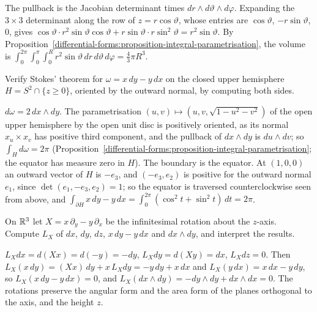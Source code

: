 \begin{solution}
The pullback is the Jacobian determinant times $dr \wedge d\vartheta \wedge d\varphi$. Expanding the $3 \times 3$ determinant along the row of $z = r\cos\vartheta$, whose entries are
$\cos\vartheta$, $-r\sin\vartheta$, $0$, gives $\cos\vartheta \cdot r^2\sin\vartheta\cos\vartheta + r\sin\vartheta \cdot r\sin^2\vartheta = r^2\sin\vartheta$. By
Proposition~\ref{differential-forms:proposition-integral-parametrisation}, the volume is $\int_0^{2\pi}\int_0^\pi\int_0^Rr^2\sin\vartheta\,dr\,d\vartheta\,d\varphi = \frac43\pi R^3$.
\end{solution}

\begin{exercise}\label{differential-forms:exercise-stokes-hemisphere}
Verify Stokes' theorem for $\omega = x\,dy - y\,dx$ on the closed upper hemisphere $H = S^2 \cap \{z \geq 0\}$, oriented by the outward normal, by computing both sides.
\end{exercise}

\begin{solution}
$d\omega = 2\,dx \wedge dy$. The parametrisation $(u, v) \mapsto (u, v, \sqrt{1 - u^2 - v^2})$ of the open upper hemisphere by the open unit disc is positively oriented, as its normal
$x_u \times x_v$ has positive third component, and the pullback of $dx \wedge dy$ is $du \wedge dv$; so $\int_Hd\omega = 2\pi$
(Proposition~\ref{differential-forms:proposition-integral-parametrisation}; the equator has measure zero in $H$). The boundary is the equator. At $(1, 0, 0)$ an outward vector of $H$ is $-e_3$,
and $(-e_3, e_2)$ is positive for the outward normal $e_1$, since $\det(e_1, -e_3, e_2) = 1$; so the equator is traversed counterclockwise seen from above, and
$\int_{\partial H}x\,dy - y\,dx = \int_0^{2\pi}(\cos^2t + \sin^2t)\,dt = 2\pi$.
\end{solution}

\begin{exercise}\label{differential-forms:exercise-lie-derivative-rotation}
On $\mathbb{R}^3$ let $X = x\,\partial_y - y\,\partial_x$ be the infinitesimal rotation about the $z$-axis. Compute $L_X$ of $dx$, $dy$, $dz$, $x\,dy - y\,dx$ and $dx \wedge dy$, and interpret the results.
\end{exercise}

\begin{solution}
$L_Xdx = d(Xx) = d(-y) = -dy$, $L_Xdy = d(Xy) = dx$, $L_Xdz = 0$. Then $L_X(x\,dy) = (Xx)\,dy + x\,L_Xdy = -y\,dy + x\,dx$ and $L_X(y\,dx) = x\,dx - y\,dy$, so
$L_X(x\,dy - y\,dx) = 0$, and $L_X(dx \wedge dy) = -dy \wedge dy + dx \wedge dx = 0$. The rotations preserve the angular form and the area form of the planes orthogonal to the axis, and the
height $z$.
\end{solution}

